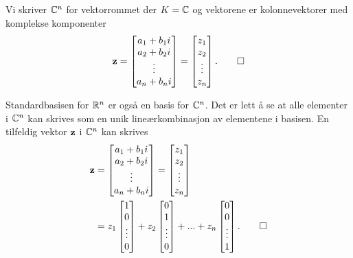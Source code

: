 \begin{defn}
Vi skriver $\mathbb{C}^n$ for vektorrommet der $K=\mathbb{C}$ og vektorene er kolonnevektorer med komplekse komponenter 
\[
\mathbf{z}=
\begin{bmatrix}
a_1+b_1 i    \\ a_2+b_2 i   \\ \vdots \\ a_n+b_n i 
\end{bmatrix}
=
\begin{bmatrix}
z_1    \\ z_2   \\ \vdots \\ z_n
\end{bmatrix}.\qedhere
\]
\end{defn}

\begin{ex}
Standardbasisen for $\mathbb{R}^n$ er også en basis for $\mathbb{C}^n$. 
Det er lett å se at alle elementer i $\mathbb{C}^n$ kan skrives som en unik lineærkombinasjon av elementene i basisen. 
En tilfeldig vektor $\mathbf{z}$ i $\mathbb{C}^n$ kan skrives
\begin{align*}
\mathbf{z}&=
\begin{bmatrix}
a_1+b_1 i    \\ a_2+b_2 i   \\ \vdots \\ a_n+b_n i 
\end{bmatrix}
=
\begin{bmatrix}
z_1    \\ z_2   \\ \vdots \\ z_n
\end{bmatrix}
\\&=
z_1
\begin{bmatrix}
1    \\ 0  \\ \vdots \\ 0
\end{bmatrix}
+
z_2
\begin{bmatrix}
0    \\ 1  \\ \vdots \\ 0
\end{bmatrix}
+...+
z_n
\begin{bmatrix}
0    \\ 0  \\ \vdots \\ 1
\end{bmatrix}. \qedhere
\end{align*}
\end{ex}

